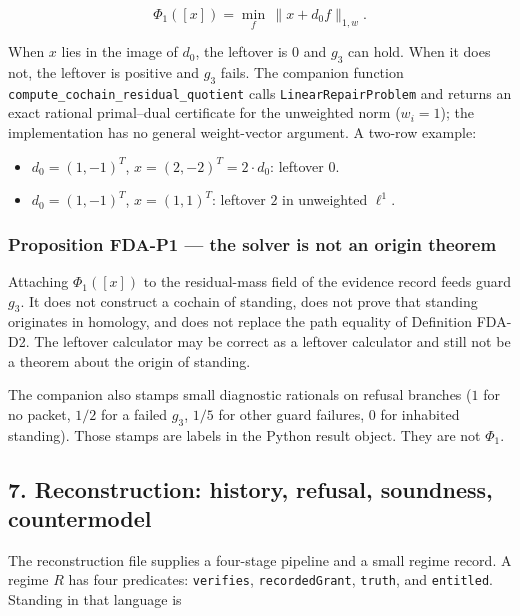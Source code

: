 \documentclass[
  11pt,
]{article}
\providecommand{\tightlist}{%
  \setlength{\itemsep}{0pt}\setlength{\parskip}{0pt}}
\begin{document}
\[
\Phi_1([x])
=
\min_f\,\|x+d_0 f\|_{1,w}.
\]

When \(x\) lies in the image of \(d_0\), the leftover is \(0\) and \(g_3\) can hold. When it does not, the leftover is positive and \(g_3\) fails. The companion function \nolinkurl{compute_cochain_residual_quotient} calls \nolinkurl{LinearRepairProblem} and returns an exact rational primal--dual certificate for the unweighted norm (\(w_i=1\)); the implementation has no general weight-vector argument. A two-row example:

\begin{itemize}
\tightlist
\item
  \(d_0=(1,-1)^T\), \(x=(2,-2)^T=2\cdot d_0\): leftover \(0\).
\item
  \(d_0=(1,-1)^T\), \(x=(1,1)^T\): leftover \(2\) in unweighted \(\ell^1\).
\end{itemize}

\subsubsection{Proposition FDA-P1 --- the solver is not an origin theorem}\label{proposition-fda-p1-the-solver-is-not-an-origin-theorem}

Attaching \(\Phi_1([x])\) to the residual-mass field of the evidence record feeds guard \(g_3\). It does not construct a cochain of standing, does not prove that standing originates in homology, and does not replace the path equality of Definition FDA-D2. The leftover calculator may be correct as a leftover calculator and still not be a theorem about the origin of standing.

The companion also stamps small diagnostic rationals on refusal branches (\(1\) for no packet, \(1/2\) for a failed \(g_3\), \(1/5\) for other guard failures, \(0\) for inhabited standing). Those stamps are labels in the Python result object. They are not \(\Phi_1\).

\subsection{7. Reconstruction: history, refusal, soundness, countermodel}\label{reconstruction-history-refusal-soundness-countermodel}

The reconstruction file supplies a four-stage pipeline and a small regime record. A regime \(R\) has four predicates: \texttt{verifies}, \texttt{recordedGrant}, \texttt{truth}, and \texttt{entitled}. Standing in that language is
\end{document}
